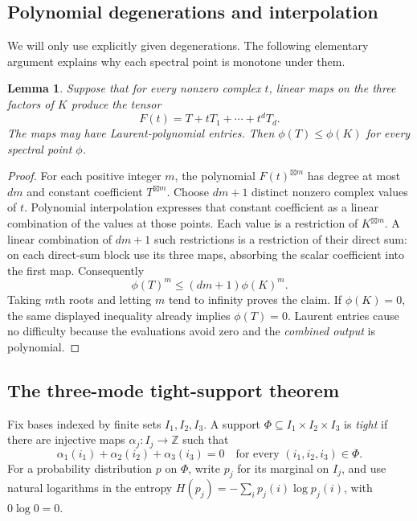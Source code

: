 \documentclass[10pt,a4paper]{article}
\newtheorem{lemma}[theorem]{Lemma}
\theoremstyle{definition}
\theoremstyle{remark}
\numberwithin{equation}{section}
\begin{document}
\subsection{Polynomial degenerations and interpolation}

We will only use explicitly given degenerations. The following
elementary argument explains why each spectral point is monotone
under them.

\begin{lemma}\label{lem:interpolation}
Suppose that for every nonzero complex $t$, linear maps on the three
factors of $K$ produce the tensor
\[
 F(t)=T+tT_1+\cdots+t^dT_d.
\]
The maps may have Laurent-polynomial entries. Then
$\phi(T)\leq\phi(K)$ for every spectral point $\phi$.
\end{lemma}

\begin{proof}
For each positive integer $m$, the polynomial
$F(t)^{\boxtimes m}$ has degree at most $dm$ and constant coefficient
$T^{\boxtimes m}$. Choose $dm+1$ distinct nonzero complex values of
$t$. Polynomial interpolation expresses that constant coefficient
as a linear combination of the values at those points. Each value
is a restriction of $K^{\boxtimes m}$. A linear combination of
$dm+1$ such restrictions is a restriction of their direct sum:
on each direct-sum block use its three maps, absorbing the scalar
coefficient into the first map. Consequently
\[
 \phi(T)^m\leq (dm+1)\phi(K)^m.
\]
Taking $m$th roots and letting $m$ tend to infinity proves the claim.
If $\phi(K)=0$, the same displayed inequality already implies
$\phi(T)=0$. Laurent entries cause no difficulty because the
evaluations avoid zero and the \emph{combined output} is polynomial.
\end{proof}

\subsection{The three-mode tight-support theorem}

Fix bases indexed by finite sets $I_1,I_2,I_3$. A support
$\Phi\subseteq I_1\times I_2\times I_3$ is \emph{tight} if there
are injective maps $\alpha_j:I_j\to\mathbb Z$ such that
\begin{equation}\label{eq:tight}
 \alpha_1(i_1)+\alpha_2(i_2)+\alpha_3(i_3)=0
 \quad\text{for every }(i_1,i_2,i_3)\in\Phi.
\end{equation}
For a probability distribution $p$ on $\Phi$, write $p_j$ for its
marginal on $I_j$, and use natural logarithms in the entropy
$H(p_j)=-\sum_i p_j(i)\log p_j(i)$, with $0\log0=0$.
\end{document}
